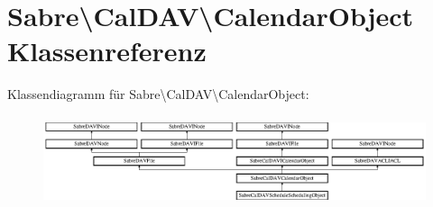 \hypertarget{class_sabre_1_1_cal_d_a_v_1_1_calendar_object}{}\section{Sabre\textbackslash{}Cal\+D\+AV\textbackslash{}Calendar\+Object Klassenreferenz}
\label{class_sabre_1_1_cal_d_a_v_1_1_calendar_object}
Klassendiagramm für Sabre\textbackslash{}Cal\+D\+AV\textbackslash{}Calendar\+Object\+:\begin{figure}[H]
\begin{center}
\leavevmode
\includegraphics[height=2.641510cm]{class_sabre_1_1_cal_d_a_v_1_1_calendar_object}
\end{center}
\end{figure}
